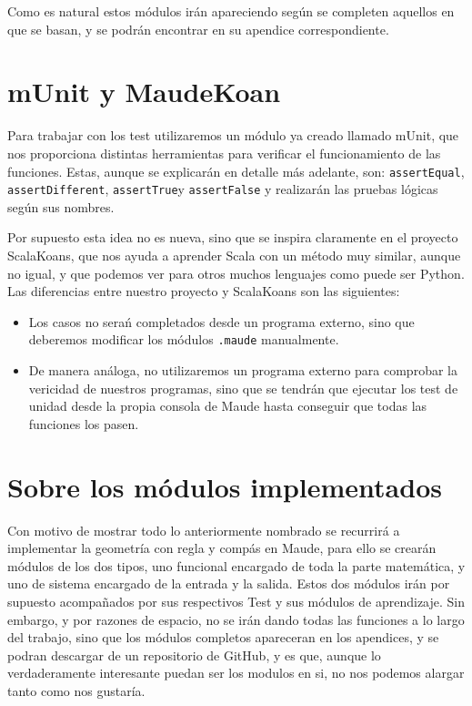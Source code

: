 Como es natural estos módulos irán apareciendo según se completen aquellos en que se basan, y se podrán encontrar en su apendice correspondiente.\par 


\section{mUnit y MaudeKoan}

Para trabajar con los test utilizaremos un módulo ya creado llamado mUnit, que nos proporciona distintas herramientas para verificar el funcionamiento de las funciones. Estas, aunque se explicarán en detalle más adelante, son: \verb"assertEqual", \verb"assertDifferent", \verb"assertTrue"y \verb"assertFalse" y realizarán las pruebas lógicas según sus nombres.\par

Por supuesto esta idea no es nueva, sino que se inspira claramente en el proyecto ScalaKoans, que nos ayuda a aprender Scala con un método muy similar, aunque no igual, y que podemos ver para otros muchos lenguajes como puede ser Python. Las diferencias entre nuestro proyecto y ScalaKoans son las siguientes:\par
\begin{itemize}
\item Los casos no serań completados desde un programa externo, sino que deberemos modificar los módulos \texttt{.maude} manualmente.
\item De manera análoga, no utilizaremos un programa externo para comprobar la vericidad de nuestros programas, sino que se tendrán que ejecutar los test de unidad desde la propia consola de Maude hasta conseguir que todas las funciones los pasen.
\end{itemize}

\section{Sobre los módulos implementados}

Con motivo de mostrar todo lo anteriormente nombrado se recurrirá a implementar la geometría con regla y compás en Maude, para ello se crearán módulos de los dos tipos, uno funcional encargado de toda la parte matemática, y uno de sistema encargado de la entrada y la salida. Estos dos módulos irán por supuesto acompañados por sus respectivos Test y sus módulos de aprendizaje. Sin embargo, y por razones de espacio, no se irán dando todas las funciones a lo largo del trabajo, sino que los módulos completos apareceran en los apendices, y se podran descargar de un repositorio de GitHub, y es que, aunque lo verdaderamente interesante puedan ser los modulos en si, no nos podemos alargar tanto como nos gustaría.\par

